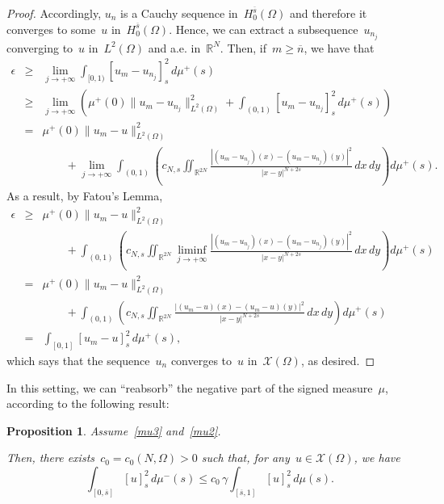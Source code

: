 \documentclass[12pt,a4paper,intlimits,sumlimits]{amsart}
\def \R {\mathbb{R}}
\theoremstyle{definition}
\theoremstyle{plain}
\newtheorem{proposition}[definition]{Proposition}
\numberwithin{equation}{section}
\renewcommand{\le}{\leqslant}
\renewcommand{\ge}{\geqslant}
\begin{document}
\begin{proof}
Accordingly, $u_n$ is a Cauchy sequence in~$H^{\overline{s}}_0(\Omega)$
and therefore it converges to some~$u$ in~$H^{\overline{s}}_0(\Omega)$.
Hence, we can extract a subsequence~$u_{n_j}$ converging to~$u$
in~$L^2(\Omega)$ and a.e. in~$\R^N$.
Then, if~$m\ge\overline{n}$, we have that
\begin{eqnarray*}
\epsilon&\ge& \lim_{j\to+\infty}
\int_{[{{ 0 }}, 1)} [u_m-u_{n_j}]^2_{s}\, d\mu^+ (s)
\\&\ge& \lim_{j\to+\infty}
\left(\mu^+(0)\|u_m- u_{n_j}\|^2_{L^2(\Omega)}+
\int_{({{ 0 }}, 1)} [u_m-u_{n_j}]^2_{s}\, d\mu^+ (s)\right)\\
&=&\mu^+(0)\|u_m- u\|^2_{L^2(\Omega)}\\&&\qquad
+\lim_{j\to+\infty}
\int_{({{ 0 }}, 1)} \left({c_{N,s}}\iint_{\R^{2N}} \frac{|(u_m-u_{n_j})(x) - (u_m-u_{n_j})(y)|^2}{|x - y|^{N+2s}}\, dx\, dy\right) d\mu^+ (s).
\end{eqnarray*}
As a result, by Fatou's Lemma,
\begin{eqnarray*}
\epsilon&\ge&
\mu^+(0)\|u_m- u\|^2_{L^2(\Omega)}\\&&\qquad
+
\int_{({{ 0 }}, 1)} \left({c_{N,s}}\iint_{\R^{2N}}
\liminf_{j\to+\infty} \frac{|(u_m-u_{n_j})(x) - (u_m-u_{n_j})(y)|^2}{|x - y|^{N+2s}}\, dx\, dy\right) d\mu^+ (s)\\&=&
\mu^+(0)\|u_m- u\|^2_{L^2(\Omega)}\\&&\qquad
+
\int_{({{ 0 }}, 1)} \left({c_{N,s}}\iint_{\R^{2N}}
\frac{|(u_m-u)(x) - (u_m-u)(y)|^2}{|x - y|^{N+2s}}\, dx\, dy\right) d\mu^+ (s)\\
&=&
\int_{[{{ 0 }}, 1]} [u_m-u]^2_{s}\, d\mu^+ (s),
\end{eqnarray*}
which says that the sequence~$u_n$ converges to~$u$
in~${\mathcal{X}}(\Omega)$, as desired.
\end{proof}

In this setting, we can ``reabsorb'' the negative part of the signed measure~$\mu$, according to the following result:

\begin{proposition}\label{crucial} Assume~\eqref{mu3} and~\eqref{mu2}.

Then, there exists~$c_0=c_0(N,\Omega)>0$ such that,
for any~$u\in\mathcal{X}(\Omega)$, we have
\[
\int_{[{{ 0 }}, \overline s]} [u]_{s}^2 \, d\mu^- (s) \le c_0\,\gamma \int_{[\overline s, 1]} [u]^2_{s} \, d\mu(s).
\]
\end{proposition}
\end{document}
